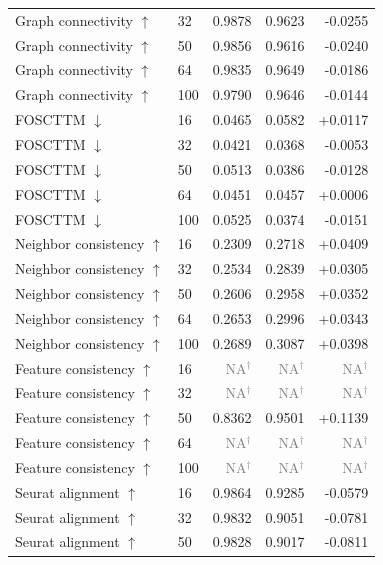 \documentclass[10pt]{article}
\begin{document}
\begin{landscape}
\begin{longtable}{@{}llrrr@{}}
Graph connectivity $\uparrow$ & 32 & 0.9878 & 0.9623 & -0.0255 \\
Graph connectivity $\uparrow$ & 50 & 0.9856 & 0.9616 & -0.0240 \\
Graph connectivity $\uparrow$ & 64 & 0.9835 & 0.9649 & -0.0186 \\
Graph connectivity $\uparrow$ & 100 & 0.9790 & 0.9646 & -0.0144 \\
\addlinespace
FOSCTTM $\downarrow$ & 16 & 0.0465 & 0.0582 & +0.0117 \\
FOSCTTM $\downarrow$ & 32 & 0.0421 & 0.0368 & -0.0053 \\
FOSCTTM $\downarrow$ & 50 & 0.0513 & 0.0386 & -0.0128 \\
FOSCTTM $\downarrow$ & 64 & 0.0451 & 0.0457 & +0.0006 \\
FOSCTTM $\downarrow$ & 100 & 0.0525 & 0.0374 & -0.0151 \\
\addlinespace
Neighbor consistency $\uparrow$ & 16 & 0.2309 & 0.2718 & +0.0409 \\
Neighbor consistency $\uparrow$ & 32 & 0.2534 & 0.2839 & +0.0305 \\
Neighbor consistency $\uparrow$ & 50 & 0.2606 & 0.2958 & +0.0352 \\
Neighbor consistency $\uparrow$ & 64 & 0.2653 & 0.2996 & +0.0343 \\
Neighbor consistency $\uparrow$ & 100 & 0.2689 & 0.3087 & +0.0398 \\
\addlinespace
Feature consistency $\uparrow$ & 16 & \textcolor{gray}{NA$^{\dagger}$} & \textcolor{gray}{NA$^{\dagger}$} & \textcolor{gray}{NA$^{\dagger}$} \\
Feature consistency $\uparrow$ & 32 & \textcolor{gray}{NA$^{\dagger}$} & \textcolor{gray}{NA$^{\dagger}$} & \textcolor{gray}{NA$^{\dagger}$} \\
Feature consistency $\uparrow$ & 50 & 0.8362 & 0.9501 & +0.1139 \\
Feature consistency $\uparrow$ & 64 & \textcolor{gray}{NA$^{\dagger}$} & \textcolor{gray}{NA$^{\dagger}$} & \textcolor{gray}{NA$^{\dagger}$} \\
Feature consistency $\uparrow$ & 100 & \textcolor{gray}{NA$^{\dagger}$} & \textcolor{gray}{NA$^{\dagger}$} & \textcolor{gray}{NA$^{\dagger}$} \\
\addlinespace
Seurat alignment $\uparrow$ & 16 & 0.9864 & 0.9285 & -0.0579 \\
Seurat alignment $\uparrow$ & 32 & 0.9832 & 0.9051 & -0.0781 \\
Seurat alignment $\uparrow$ & 50 & 0.9828 & 0.9017 & -0.0811 \\

\end{longtable}
\end{landscape}
\end{document}
